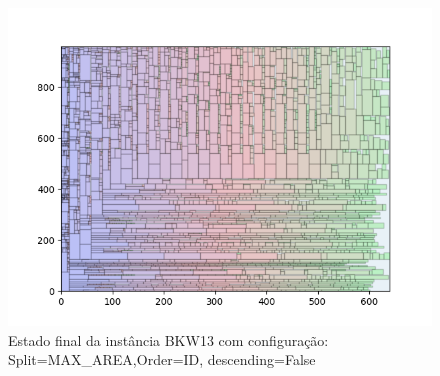 \begin{figure}[H]
    \centering
    \caption[]{Estado final da instância BKW13 com configuração: Split=MAX_AREA,Order=ID, descending=False}
    \label{fig:bkw13-max_area-id-false}
    \includegraphics[scale=0.5]{output/figures/bkw/bkw13/max_area/id/false/0000}
\end{figure}